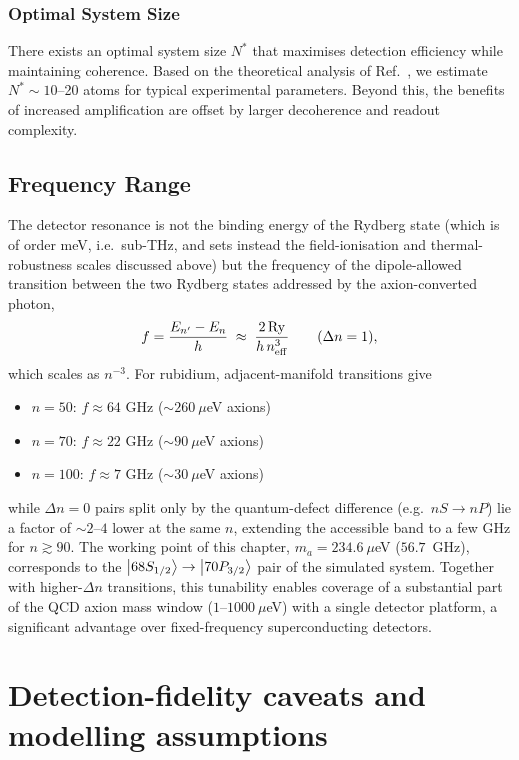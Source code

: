 \subsubsection{Optimal System Size}

There exists an optimal system size $N^*$ that maximises detection efficiency while maintaining coherence. Based on the theoretical analysis of Ref.~\cite{Nill2024}, we estimate $N^* \sim 10$--20 atoms for typical experimental parameters. Beyond this, the benefits of increased amplification are offset by larger decoherence and readout complexity.

\subsection*{Frequency Range}

The detector resonance is not the binding energy of the Rydberg state (which
is of order meV, i.e.\ sub-THz, and sets instead the field-ionisation and
thermal-robustness scales discussed above) but the frequency of the
dipole-allowed transition between the two Rydberg states addressed by the
axion-converted photon,
\begin{equation}
    f = \frac{E_{n'} - E_{n}}{h}
    \;\approx\; \frac{2\,\mathrm{Ry}}{h\, n_{\rm eff}^{3}}
    \qquad (\Delta n = 1),
\end{equation}
which scales as $n^{-3}$. For rubidium, adjacent-manifold transitions give
\begin{itemize}
    \item $n = 50$: $f \approx 64$ GHz ($\sim 260~\mu$eV axions)
    \item $n = 70$: $f \approx 22$ GHz ($\sim 90~\mu$eV axions)
    \item $n = 100$: $f \approx 7$ GHz ($\sim 30~\mu$eV axions)
\end{itemize}
while $\Delta n = 0$ pairs split only by the quantum-defect difference
(e.g.\ $nS \to nP$) lie a factor of $\sim 2$--$4$ lower at the same $n$,
extending the accessible band to a few GHz for $n \gtrsim 90$. The working
point of this chapter, $m_a = 234.6~\mu$eV ($56.7$~GHz), corresponds to the
$\ket{68S_{1/2}} \to \ket{70P_{3/2}}$ pair of the simulated system. Together
with higher-$\Delta n$ transitions, this tunability enables coverage of a
substantial part of the QCD axion mass window ($1$--$1000~\mu$eV) with a
single detector platform, a significant advantage over fixed-frequency
superconducting detectors.

\section{Detection-fidelity caveats and modelling assumptions}

